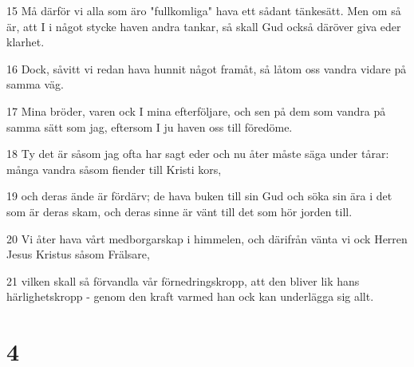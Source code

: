 \par 15 Må därför vi alla som äro "fullkomliga" hava ett sådant tänkesätt. Men om så är, att I i något stycke haven andra tankar, så skall Gud också däröver giva eder klarhet.
\par 16 Dock, såvitt vi redan hava hunnit något framåt, så låtom oss vandra vidare på samma väg.
\par 17 Mina bröder, varen ock I mina efterföljare, och sen på dem som vandra på samma sätt som jag, eftersom I ju haven oss till föredöme.
\par 18 Ty det är såsom jag ofta har sagt eder och nu åter måste säga under tårar: många vandra såsom fiender till Kristi kors,
\par 19 och deras ände är fördärv; de hava buken till sin Gud och söka sin ära i det som är deras skam, och deras sinne är vänt till det som hör jorden till.
\par 20 Vi åter hava vårt medborgarskap i himmelen, och därifrån vänta vi ock Herren Jesus Kristus såsom Frälsare,
\par 21 vilken skall så förvandla vår förnedringskropp, att den bliver lik hans härlighetskropp - genom den kraft varmed han ock kan underlägga sig allt.

\chapter{4}

